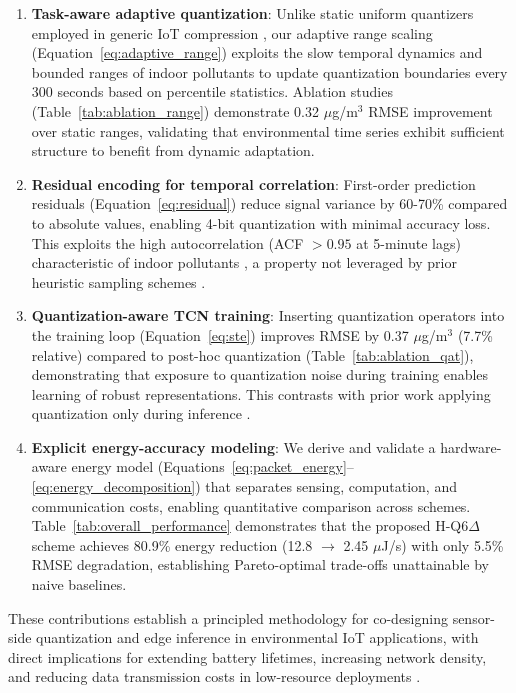 \begin{enumerate}
\item \textbf{Task-aware adaptive quantization}: Unlike static uniform quantizers employed in generic IoT compression \cite{taştan2022lowcost}, our adaptive range scaling (Equation~\eqref{eq:adaptive_range}) exploits the slow temporal dynamics and bounded ranges of indoor pollutants to update quantization boundaries every 300 seconds based on percentile statistics. Ablation studies (Table~\ref{tab:ablation_range}) demonstrate 0.32 $\mu$g/m$^3$ RMSE improvement over static ranges, validating that environmental time series exhibit sufficient structure to benefit from dynamic adaptation.

\item \textbf{Residual encoding for temporal correlation}: First-order prediction residuals (Equation~\eqref{eq:residual}) reduce signal variance by 60-70\% compared to absolute values, enabling 4-bit quantization with minimal accuracy loss. This exploits the high autocorrelation (ACF $> 0.95$ at 5-minute lags) characteristic of indoor pollutants \cite{karmakar2024exploring}, a property not leveraged by prior heuristic sampling schemes \cite{gunasekar2025power}.

\item \textbf{Quantization-aware TCN training}: Inserting quantization operators into the training loop (Equation~\eqref{eq:ste}) improves RMSE by 0.37 $\mu$g/m$^3$ (7.7\% relative) compared to post-hoc quantization (Table~\ref{tab:ablation_qat}), demonstrating that exposure to quantization noise during training enables learning of robust representations. This contrasts with prior work applying quantization only during inference \cite{mazinani2025air}.

\item \textbf{Explicit energy-accuracy modeling}: We derive and validate a hardware-aware energy model (Equations~\eqref{eq:packet_energy}--\eqref{eq:energy_decomposition}) that separates sensing, computation, and communication costs, enabling quantitative comparison across schemes. Table~\ref{tab:overall_performance} demonstrates that the proposed H-Q6$\Delta$ scheme achieves 80.9\% energy reduction (12.8 $\rightarrow$ 2.45 $\mu$J/s) with only 5.5\% RMSE degradation, establishing Pareto-optimal trade-offs unattainable by naive baselines.
\end{enumerate}

These contributions establish a principled methodology for co-designing sensor-side quantization and edge inference in environmental IoT applications, with direct implications for extending battery lifetimes, increasing network density, and reducing data transmission costs in low-resource deployments \cite{cowell2025moving, ray2026hiapllm}.

